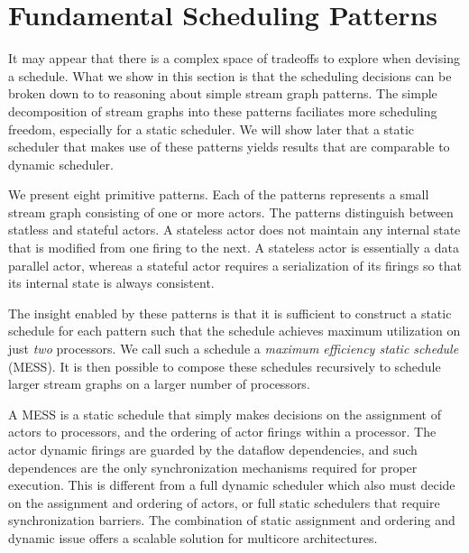 \section{Fundamental Scheduling Patterns}


It may appear that there is a complex space of tradeoffs to explore
when devising a schedule. What we show in this section is that the
scheduling decisions can be broken down to to reasoning about simple
stream graph patterns. The simple decomposition of stream graphs into
these patterns faciliates more scheduling freedom, especially for a
static scheduler. We will show later that a static scheduler that
makes use of these patterns yields results that are comparable to
dynamic scheduler.

We present eight primitive patterns. Each of the patterns represents a
small stream graph consisting of one or more actors. The patterns
distinguish between statless and stateful actors. A stateless actor
does not maintain any internal state that is modified from one firing
to the next. A stateless actor is essentially a data parallel actor,
whereas a stateful actor requires a serialization of its firings so
that its internal state is always consistent.

The insight enabled by these patterns is that it is sufficient to
construct a static schedule for each pattern such that the schedule
achieves maximum utilization on just {\it two} processors. We call
such a schedule a {\it maximum efficiency static schedule} (MESS). It
is then possible to compose these schedules recursively to schedule
larger stream graphs on a larger number of processors.

A MESS is a static schedule that simply makes decisions on the
assignment of actors to processors, and the ordering of actor firings
within a processor. The actor dynamic firings are guarded by the
dataflow dependencies, and such dependences are the only
synchronization mechanisms required for proper execution. 
This is different from a full dynamic scheduler which also must decide
on the assignment and ordering of actors, or full static schedulers
that require synchronization barriers. The combination of static
assignment and ordering and dynamic issue offers a scalable solution
for multicore architectures.

